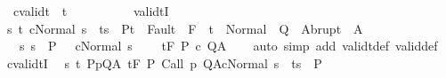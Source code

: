 \begin{isabellebody}
\ \ cvalidt\ \ {\isacharparenleft}{\isachardoublequoteopen}{\isacharunderscore}{\isacharcomma}{\isacharunderscore}{\isacharbar}{\isacharequal}t{\isacharprime}{\isacharslash}{\isacharunderscore}\ {\isacharslash}\ {\isacharunderscore}\ {\isacharunderscore}\ {\isacharunderscore}{\isacharcomma}{\isacharunderscore}{\isachardoublequoteclose}\ \ {\isacharbrackleft}{}{}{\isacharcomma}{}{}{\isacharcomma}{}{}{\isacharcomma}{}{}{}{}{\isacharcomma}\ {}{}{\isacharcomma}\ {}{}{}{}{\isacharcomma}{}{}{}{}{\isacharbrackright}\ {}{}{\isacharparenright}%
\isamarkuptrue%
\isamarkupfalse%
\ validtI{\isacharcolon}\ \isanewline
\ {\isachardoublequoteopen}{\isasymlbrakk}{\isasymAnd}s\ t{\isachardot}\ {\isasymlbrakk}{\isasymGamma}{\isasymturnstile}{\isasymlangle}c{\isacharcomma}Normal\ s{\isasymrangle}\ {\isasymRightarrow}\ t{\isacharsemicolon}s\ {\isasymin}\ P{\isacharsemicolon}t\ {\isasymnotin}\ Fault\ {\isacharbackquote}\ F{\isasymrbrakk}\ {\isasymLongrightarrow}\ t\ {\isasymin}\ Normal\ {\isacharbackquote}\ Q\ {\isasymunion}\ Abrupt\ {\isacharbackquote}\ A{\isacharsemicolon}\isanewline
\ \ \ {\isasymAnd}s{\isachardot}\ s\ {\isasymin}\ P\ {\isasymLongrightarrow}\ {\isasymGamma}{\isasymturnstile}\ c{\isasymdown}{\isacharparenleft}Normal\ s{\isacharparenright}\ {\isasymrbrakk}\isanewline
\ \ {\isasymLongrightarrow}\ {\isasymGamma}{\isasymTurnstile}\isactrlsub t\isactrlbsub {\isacharslash}F\isactrlesub \ P\ c\ Q{\isacharcomma}A{\isachardoublequoteclose}\isanewline
%
\isadelimproof
\ \ %
\endisadelimproof
%
\isatagproof
{}\isamarkupfalse%
\ {\isacharparenleft}auto\ simp\ add{\isacharcolon}\ validt{\isacharunderscore}def\ valid{\isacharunderscore}def{\isacharparenright}%
\endisatagproof
{\isafoldproof}%
%
\isadelimproof
\isanewline
%
\endisadelimproof
\isanewline
{}\isamarkupfalse%
\ cvalidtI{\isacharcolon}\ \isanewline
\ {\isachardoublequoteopen}{\isasymlbrakk}{\isasymAnd}s\ t{\isachardot}\ {\isasymlbrakk}{\isasymforall}{\isacharparenleft}P{\isacharcomma}p{\isacharcomma}Q{\isacharcomma}A{\isacharparenright}{\isasymin}{\isasymTheta}{\isachardot}\ {\isasymGamma}{\isasymTurnstile}\isactrlsub t\isactrlbsub {\isacharslash}F\isactrlesub \ P\ {\isacharparenleft}Call\ p{\isacharparenright}\ Q{\isacharcomma}A{\isacharsemicolon}{\isasymGamma}{\isasymturnstile}{\isasymlangle}c{\isacharcomma}Normal\ s{\isasymrangle}\ {\isasymRightarrow}\ t{\isacharsemicolon}s\ {\isasymin}\ P{\isacharsemicolon}\ \isanewline

\end{isabellebody}
